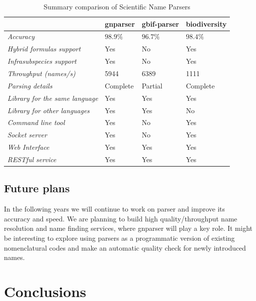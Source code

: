 \documentclass{bmcart}
\begin{document}
\begin{table}[htb]
  \begin{center}
    \caption{Summary comparison of Scientific Name Parsers}
    \label{table:summary}
    \begin{tabular}{|l|*{3}{l}|}
      \hline
                             & gnparser & gbif-parser & biodiversity \\
      \hline
      \textit{Accuracy}      & $98.9\%$ & $96.7\%$    & $98.4\%$     \\
      \textit{Hybrid formulas support}      & Yes     & No     & Yes \\
      \textit{Infrasubspecies support}& Yes       & No         & Yes \\
      \textit{Throughput (names/s)}& 5944  & 6389       & 1111         \\
      \textit{Parsing details}     & Complete & Partial    & Complete    \\
      \textit{Library for the same language}    & Yes      & Yes    & Yes \\
      \textit{Library for other languages}            & Yes & Yes    & No    \\
      \textit{Command line tool}      & Yes    & No       & Yes        \\
      \textit{Socket server}      & Yes    & No       & Yes        \\
      \textit{Web Interface}      & Yes    & Yes       & Yes        \\
      \textit{RESTful service}      & Yes    & Yes       & Yes        \\
      \hline
    \end{tabular}
  \end{center}
\end{table}

\subsection*{Future plans}

In the following years we will continue to work on parser and improve its
accuracy and speed. We are planning to build high quality/throughput name
resolution and name finding services, where gnparser will play a key role.
It might be interesting to explore using parsers as a programmatic version
of existing nomenclatural codes and make an automatic quality check for newly
introduced names.

\section*{Conclusions}
\end{document}

